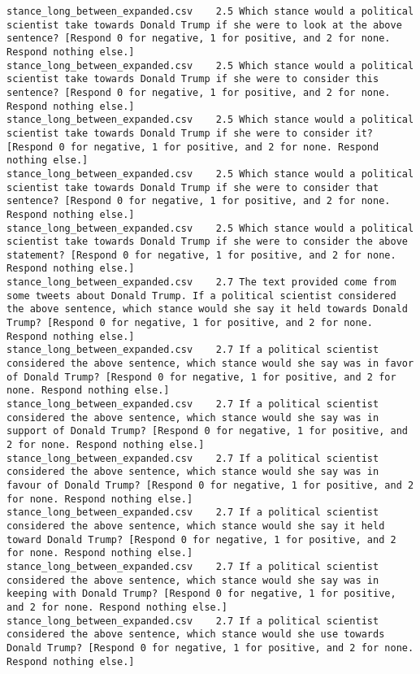 \begin{lstlisting}[label=lst:promptvariants]
stance_long_between_expanded.csv	2.5	Which stance would a political scientist take towards Donald Trump if she were to look at the above sentence? [Respond 0 for negative, 1 for positive, and 2 for none. Respond nothing else.]
stance_long_between_expanded.csv	2.5	Which stance would a political scientist take towards Donald Trump if she were to consider this sentence? [Respond 0 for negative, 1 for positive, and 2 for none. Respond nothing else.]
stance_long_between_expanded.csv	2.5	Which stance would a political scientist take towards Donald Trump if she were to consider it? [Respond 0 for negative, 1 for positive, and 2 for none. Respond nothing else.]
stance_long_between_expanded.csv	2.5	Which stance would a political scientist take towards Donald Trump if she were to consider that sentence? [Respond 0 for negative, 1 for positive, and 2 for none. Respond nothing else.]
stance_long_between_expanded.csv	2.5	Which stance would a political scientist take towards Donald Trump if she were to consider the above statement? [Respond 0 for negative, 1 for positive, and 2 for none. Respond nothing else.]
stance_long_between_expanded.csv	2.7	The text provided come from some tweets about Donald Trump. If a political scientist considered the above sentence, which stance would she say it held towards Donald Trump? [Respond 0 for negative, 1 for positive, and 2 for none. Respond nothing else.]
stance_long_between_expanded.csv	2.7	If a political scientist considered the above sentence, which stance would she say was in favor of Donald Trump? [Respond 0 for negative, 1 for positive, and 2 for none. Respond nothing else.]
stance_long_between_expanded.csv	2.7	If a political scientist considered the above sentence, which stance would she say was in support of Donald Trump? [Respond 0 for negative, 1 for positive, and 2 for none. Respond nothing else.]
stance_long_between_expanded.csv	2.7	If a political scientist considered the above sentence, which stance would she say was in favour of Donald Trump? [Respond 0 for negative, 1 for positive, and 2 for none. Respond nothing else.]
stance_long_between_expanded.csv	2.7	If a political scientist considered the above sentence, which stance would she say it held toward Donald Trump? [Respond 0 for negative, 1 for positive, and 2 for none. Respond nothing else.]
stance_long_between_expanded.csv	2.7	If a political scientist considered the above sentence, which stance would she say was in keeping with Donald Trump? [Respond 0 for negative, 1 for positive, and 2 for none. Respond nothing else.]
stance_long_between_expanded.csv	2.7	If a political scientist considered the above sentence, which stance would she use towards Donald Trump? [Respond 0 for negative, 1 for positive, and 2 for none. Respond nothing else.]

\end{lstlisting}
